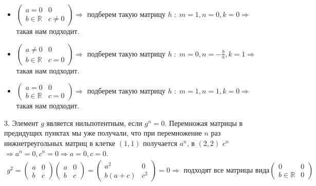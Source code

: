 \documentclass[a4paper,11pt]{article}
\begin{document}
\begin{itemize}
	\item  $ \begin{pmatrix}
	a = 0 & 0 \\[2pt]
	b \in \mathbb{R} & c \neq 0
	\end{pmatrix} \Rightarrow $ подберем такую матрицу $ h \; : \; m = 1, n = 0, k = 0 \Rightarrow $ такая нам подходит.
	\item  $ \begin{pmatrix}
	a \neq 0 & 0 \\[2pt]
	b \in \mathbb{R} & c = 0
	\end{pmatrix} \Rightarrow $ подберем такую матрицу $ h \; : \; m = 0, n = -\frac{b}{a}, k = 1 \Rightarrow $ такая нам подходит.
	\item  $ \begin{pmatrix}
	a = 0 & 0 \\[2pt]
	b \in \mathbb{R} & c = 0
	\end{pmatrix} \Rightarrow $ подберем такую матрицу $ h \; : \; m = 1, n = 1, k = 0 \Rightarrow $ такая нам подходит.
\end{itemize}
3. Элемент $ g $ является нильпотентным, если $ g^{n} = 0 $.  Перемножая матрицы в предидущих пунктах мы уже получали, что при перемножение $ n $ раз нижнетреугольных матриц в клетке $ (1, 1) $ получается $ a^n $, в $ (2, 2) $ $ c^{n} $ $ \Rightarrow a^{n} = 0, c^{n} = 0 \Rightarrow a = 0, c = 0 $.
\begin{gather*}
	g^2 = \begin{pmatrix}
	a & 0 \\[2pt]
	b & c
	\end{pmatrix}
	\begin{pmatrix}
	a & 0 \\[2pt]
	b & c
	\end{pmatrix}
	= 
	\begin{pmatrix}
	a^2 & 0 \\[2pt]
	b(a + c) & c^2
	\end{pmatrix} = 0 \Rightarrow \text{ подходят все матрицы вида}
	\begin{pmatrix}
	0 & 0 \\[2pt]
	b \in \mathbb{R} & 0
	\end{pmatrix}
\end{gather*}  
\newpage



\end{document}
